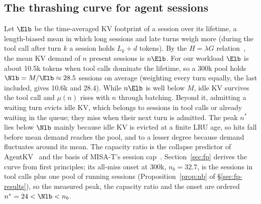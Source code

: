 \subsection{The thrashing curve for agent sessions}\label{sec:theory-curve}
Let $\Elb$ be the time-averaged KV footprint of a session over its lifetime, a length-biased mean in which long sessions and late turns weigh more (during the tool call after turn $k$ a session holds $L_k+d$ tokens). By the $H=\lambda G$ relation~\citep{brumelle1971relation,heyman1980relation}, the mean KV demand of $n$ present sessions is $n\Elb$. For our workload $\Elb$ is about 10.5k tokens when tool calls dominate the lifetime, so a 300k pool holds $\Nlb=M/\Elb\approx28.5$ sessions on average (weighting every turn equally, the last included, gives 10.6k and 28.4). While $n\Elb$ is well below $M$, idle KV survives the tool call and $\mu(n)$ rises with $n$ through batching. Beyond it, admitting a waiting turn evicts idle KV, which belongs to sessions in tool calls or already waiting in the queue; they miss when their next turn is admitted. The peak $n^*$ lies below $\Nlb$ mainly because idle KV is evicted at a finite LRU age, so hits fall before mean demand reaches the pool, and to a lesser degree because demand fluctuates around its mean. The capacity ratio is the collapse predictor of AgentKV~\citep{anon2026agentkv} and the basis of MISA-T's session cap~\citep{hong2026misat}. Section~\ref{sec:fp} derives the curve from first principles; its all-miss onset at 300k, $n_b=32.7$, is the sessions in tool calls plus one pool of running sessions (Proposition~\ref{prop:nb} of \S\ref{sec:fp-results}), so the measured peak, the capacity ratio and the onset are ordered $n^*=24<\Nlb<n_b$.


